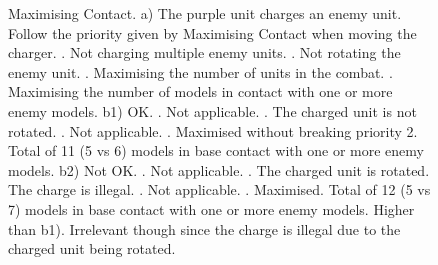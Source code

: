 \newcommand{\maxcontactA}{a)}
\newcommand{\maxcontactBOne}{b1)}
\newcommand{\maxcontactBTwo}{b2)}
\newcommand{\maxcontactCharge}{\normalfontsize{\flufffont{Charge!}}}

\begin{figure}[!htbp]
\centering
\hypertarget{maximising_contact_figure}{
\def\svgwidth{\textwidth}
}
\caption{Maximising Contact.\captionpar
a) The purple unit charges an enemy unit. Follow the priority given by Maximising Contact when moving the charger.\captionlist
{}. Not charging multiple enemy units.\newline
{}. Not rotating the enemy unit.\newline
{}. Maximising the number of units in the combat.\newline
{}. Maximising the number of models in contact with one or more enemy models.
\captionpar
b1) OK.\captionlist
{}. Not applicable.\newline
{}. The charged unit is not rotated.\newline
{}. Not applicable.\newline
{}. Maximised without breaking priority 2. Total of 11 (5 vs 6) models in base contact with one or more enemy models.
\captionpar
b2) Not OK.\captionlist
{}. Not applicable.\newline
{}. The charged unit is rotated. The charge is illegal.\newline
{}. Not applicable.\newline
{}. Maximised. Total of 12 (5 vs 7) models in base contact with one or more enemy models. Higher than b1). Irrelevant though since the charge is illegal due to the charged unit being rotated.}
\label{figure/maximising_contact}
\end{figure}

\newcommand{\multiplechargesCharge}{\flufffont{Charge!}}
\newcommand{\multiplechargesA}{a)}
\newcommand{\multiplechargesBOne}{b1)}
\newcommand{\multiplechargesBTwo}{b2)}
\newcommand{\multiplechargesBThree}{b3)}
\newcommand{\multiplechargesBFour}{b4)}

